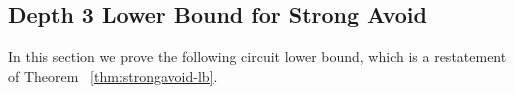 
\subsection{Depth 3 Lower Bound for Strong Avoid}
\label{sec:depth3-lb}

In this section we prove the following circuit lower bound, which is a restatement of Theorem ~\ref{thm:strongavoid-lb}.

